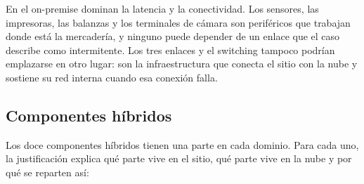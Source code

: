 En el on-premise dominan la latencia y la conectividad. Los sensores, las impresoras, las balanzas y los terminales de cámara son periféricos que trabajan donde está la mercadería, y ninguno puede depender de un enlace que el caso describe como intermitente. Los tres enlaces y el switching tampoco podrían emplazarse en otro lugar: son la infraestructura que conecta el sitio con la nube y sostiene su red interna cuando esa conexión falla.

\subsection{Componentes híbridos}

Los doce componentes híbridos tienen una parte en cada dominio. Para cada uno, la justificación explica qué parte vive en el sitio, qué parte vive en la nube y por qué se reparten así:

